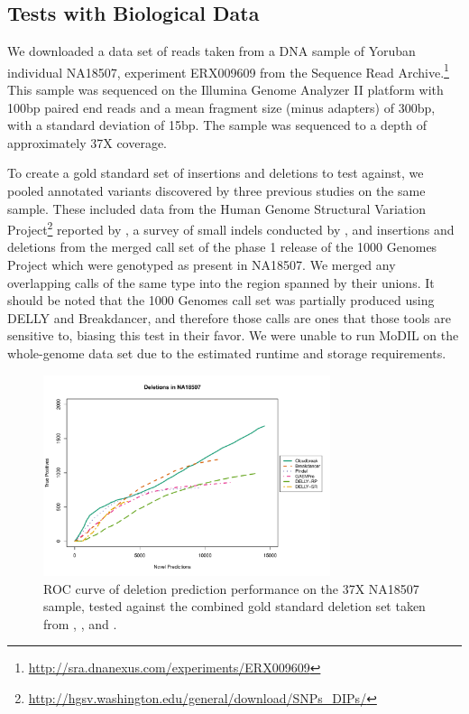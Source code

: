 \documentclass[11pt]{article}
\begin{document}
\subsection{Tests with Biological Data}

We downloaded a data set of reads taken from a DNA sample of Yoruban individual NA18507, experiment ERX009609 from the Sequence Read Archive.\footnote{\url{http://sra.dnanexus.com/experiments/ERX009609}} This sample was sequenced on the Illumina Genome Analyzer II platform with 100bp paired end reads and a mean fragment size (minus adapters) of 300bp, with a standard deviation of 15bp. The sample was sequenced to a depth of approximately 37X coverage.

To create a gold standard set of insertions and deletions to test against, we pooled annotated variants discovered by three previous studies on the same sample. These included data from the Human Genome Structural Variation Project\footnote{\url{http://hgsv.washington.edu/general/download/SNPs_DIPs/}} reported by \textcite{Kidd:2008p926}, a survey of small indels conducted by \textcite{Mills:2011fi}, and insertions and deletions from the merged call set of the phase 1 release of the 1000 Genomes Project \autocite{GenomesProjectConsortium:2012co} which were genotyped as present in NA18507. We merged any overlapping calls of the same type into the region spanned by their unions. It should be noted that the 1000 Genomes call set was partially produced using DELLY and Breakdancer, and therefore those calls are ones that those tools are sensitive to, biasing this test in their favor. We were unable to run MoDIL on the whole-genome data set due to the estimated runtime and storage requirements.

\begin{figure}
\centering
\includegraphics[width=0.75\textwidth]{../figures/NA18507_DELS_ROC.pdf}
\caption{ROC curve of deletion prediction performance on the 37X NA18507 sample, tested against the combined gold standard deletion set taken from \textcite{Kidd:2008p926}, \textcite{Mills:2011fi}, and \textcite{GenomesProjectConsortium:2012co}.}
\label{NA18507DeletionsRoc}
\end{figure}
\end{document}
